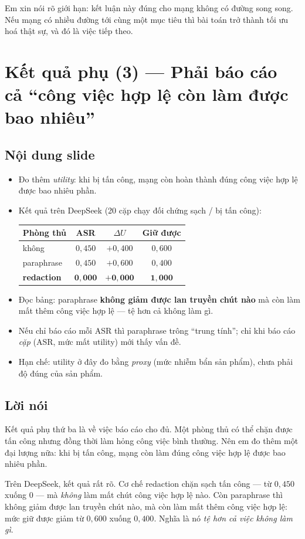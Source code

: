 \documentclass[11pt,a4paper]{article}
\newcommand{\slide}[1]{\section{#1}}
\newcommand{\noidung}{\subsection*{Nội dung slide}}
\newcommand{\loinoi}{\subsection*{Lời nói}}
\begin{document}
Em xin nói rõ giới hạn: kết luận này đúng cho mạng không có đường song song. Nếu mạng
có nhiều đường tới cùng một mục tiêu thì bài toán trở thành tối ưu hoá thật sự, và đó
là việc tiếp theo.

\slide{Kết quả phụ (3) --- Phải báo cáo cả ``công việc hợp lệ còn làm được bao nhiêu''}

\noidung
\begin{itemize}
  \item Đo thêm \emph{utility}: khi bị tấn công, mạng còn hoàn thành đúng công việc hợp
        lệ được bao nhiêu phần.
  \item Kết quả trên DeepSeek (20 cặp chạy đối chứng sạch / bị tấn công):
        \begin{center}
        \begin{tabular}{|l|c|c|c|}
        \hline
        \textbf{Phòng thủ} & \textbf{ASR} & \textbf{$\Delta U$} & \textbf{Giữ được}\\
        \hline
        không & $0{,}450$ & $+0{,}400$ & $0{,}600$\\
        paraphrase & $0{,}450$ & $+0{,}600$ & $0{,}400$\\
        \textbf{redaction} & $\mathbf{0{,}000}$ & $\mathbf{+0{,}000}$ & $\mathbf{1{,}000}$\\
        \hline
        \end{tabular}
        \end{center}
  \item Đọc bảng: paraphrase \textbf{không giảm được lan truyền chút nào} mà còn làm
        mất thêm công việc hợp lệ --- tệ hơn cả không làm gì.
  \item Nếu chỉ báo cáo mỗi ASR thì paraphrase trông ``trung tính''; chỉ khi báo cáo
        \emph{cặp} (ASR, mức mất utility) mới thấy vấn đề.
  \item Hạn chế: utility ở đây đo bằng \emph{proxy} (mức nhiễm bẩn sản phẩm), chưa
        phải độ đúng của sản phẩm.
\end{itemize}

\loinoi
Kết quả phụ thứ ba là về việc báo cáo cho đủ. Một phòng thủ có thể chặn được tấn công
nhưng đồng thời làm hỏng công việc bình thường. Nên em đo thêm một đại lượng nữa: khi
bị tấn công, mạng còn làm đúng công việc hợp lệ được bao nhiêu phần.

Trên DeepSeek, kết quả rất rõ. Cơ chế redaction chặn sạch tấn công --- từ $0{,}450$
xuống $0$ --- mà \emph{không} làm mất chút công việc hợp lệ nào. Còn paraphrase thì
không giảm được lan truyền chút nào, mà còn làm mất thêm công việc hợp lệ: mức giữ
được giảm từ $0{,}600$ xuống $0{,}400$. Nghĩa là nó \emph{tệ hơn cả việc không làm gì}.
\end{document}
